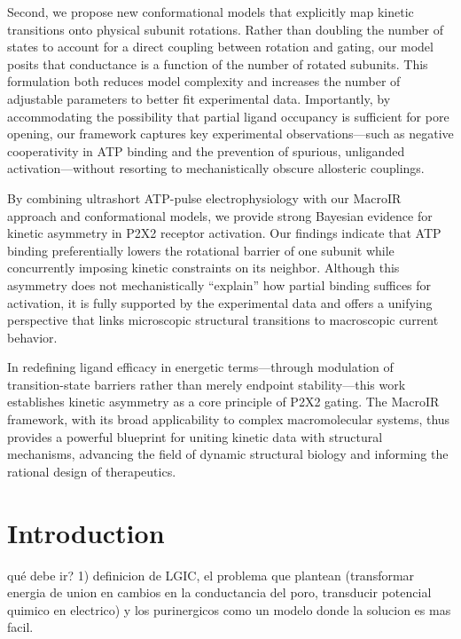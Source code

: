 \documentclass[pdflatex,sn-mathphys-num]{sn-jnl}%
\theoremstyle{thmstyleone}%
\theoremstyle{thmstyletwo}%
\theoremstyle{thmstylethree}%
\begin{document}
Second, we propose new conformational models that explicitly map kinetic transitions onto physical subunit rotations. Rather than doubling the number of states to account for a direct coupling between rotation and gating, our model posits that conductance is a function of the number of rotated subunits. This formulation both reduces model complexity and increases the number of adjustable parameters to better fit experimental data. Importantly, by accommodating the possibility that partial ligand occupancy is sufficient for pore opening, our framework captures key experimental observations—such as negative cooperativity in ATP binding and the prevention of spurious, unliganded activation—without resorting to mechanistically obscure allosteric couplings.

By combining ultrashort ATP-pulse electrophysiology with our MacroIR approach and conformational models, we provide strong Bayesian evidence for kinetic asymmetry in P2X2 receptor activation. Our findings indicate that ATP binding preferentially lowers the rotational barrier of one subunit while concurrently imposing kinetic constraints on its neighbor. Although this asymmetry does not mechanistically “explain” how partial binding suffices for activation, it is fully supported by the experimental data and offers a unifying perspective that links microscopic structural transitions to macroscopic current behavior.

In redefining ligand efficacy in energetic terms—through modulation of transition-state barriers rather than merely endpoint stability—this work establishes kinetic asymmetry as a core principle of P2X2 gating. The MacroIR framework, with its broad applicability to complex macromolecular systems, thus provides a powerful blueprint for uniting kinetic data with structural mechanisms, advancing the field of dynamic structural biology and informing the rational design of therapeutics.


\section{Introduction}
qué debe ir?
1) definicion de LGIC, el problema que plantean (transformar energia de union en cambios en la conductancia del poro, transducir potencial quimico en electrico) y los purinergicos como un modelo donde la solucion es mas facil.
\end{document}
